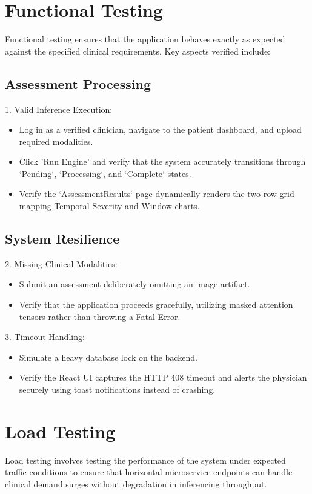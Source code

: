 \documentclass{fisatprojectfinal}
\begin{document}
\section{Functional Testing}
Functional testing ensures that the application behaves exactly as expected against the specified clinical requirements. Key aspects verified include:

\subsection*{Assessment Processing}
1. Valid Inference Execution:
\begin{itemize}
    \item Log in as a verified clinician, navigate to the patient dashboard, and upload required modalities.
    \item Click 'Run Engine' and verify that the system accurately transitions through `Pending`, `Processing`, and `Complete` states.
    \item Verify the `AssessmentResults` page dynamically renders the two-row grid mapping Temporal Severity and Window charts.
\end{itemize}

\subsection*{System Resilience}
2. Missing Clinical Modalities:
\begin{itemize}
    \item Submit an assessment deliberately omitting an image artifact.
    \item Verify that the application proceeds gracefully, utilizing masked attention tensors rather than throwing a Fatal Error.
\end{itemize}

3. Timeout Handling:
\begin{itemize}
    \item Simulate a heavy database lock on the backend.
    \item Verify the React UI captures the HTTP 408 timeout and alerts the physician securely using toast notifications instead of crashing.
\end{itemize}

\section{Load Testing}
Load testing involves testing the performance of the system under expected traffic conditions to ensure that horizontal microservice endpoints can handle clinical demand surges without degradation in inferencing throughput.
\end{document}
